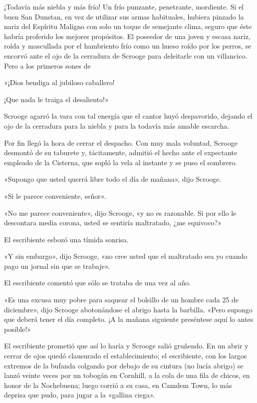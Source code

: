 \documentclass{novela}
\begin{document}
 ¡Todavía más niebla y más frío! Un frío punzante, penetrante, mordiente. Si el buen San Dunstan, en vez de utilizar sus armas habituales, hubiera pinzado la nariz del Espíritu Maligno con solo un toque de semejante clima, seguro que éste habría proferido los mejores propósitos. El poseedor de una joven y escasa nariz, roída  y mascullada por el hambriento frío como un hueso roído por los perros, se encorvó ante el ojo de la cerradura de Scrooge para deleitarle con un villancico. Pero a los primeros sones de



           «¡Dios bendiga al jubiloso caballero!

           ¡Que nada le traiga el desaliento!»



 Scrooge agarró la vara con tal energía que el cantor huyó despavorido, dejando el ojo de la cerradura para la niebla y para la todavía más amable escarcha.

 Por fin llegó la hora de cerrar el despacho. Con muy mala voluntad, Scrooge desmontó de su taburete y, tácitamente, admitió el hecho ante el expectante empleado de la Cisterna, que sopló la vela al instante y se puso el sombrero.

 «Supongo que usted querrá libre todo el día de mañana», dijo Scrooge.

 «Si le parece conveniente, señor».

 «No me parece conveniente», dijo Scrooge, «y no es razonable. Si por ello le descontara media corona, usted se sentiría maltratado, ¿me equivoco?»

 El escribiente esbozó una tímida sonrisa.

 «Y sin embargo», dijo Scrooge, «no cree usted que el maltratado sea yo cuando pago un jornal sin que se trabaje».

 El escribiente comentó que sólo se trataba de una vez al año.

 «Es una excusa muy pobre para saquear el bolsillo de un hombre cada 25 de diciembre», dijo Scrooge abotonándose el abrigo hasta la barbilla. «Pero supongo que deberá tener el día completo. ¡A la mañana siguiente preséntese aquí lo antes posible!»

 El escribiente prometió que así lo haría y Scrooge salió gruñendo. En un abrir y cerrar de ojos quedó clausurado el establecimiento; el escribiente, con los largos extremos de la bufanda colgando por debajo de su cintura (no lucía abrigo) se lanzó veinte veces por un tobogán en Cornhill, a la cola de una fila de chicos, en honor de la Nochebuena; luego corrió a su casa, en Camdem Town, lo más deprisa que pudo, para jugar a la «gallina ciega».
\end{document}
